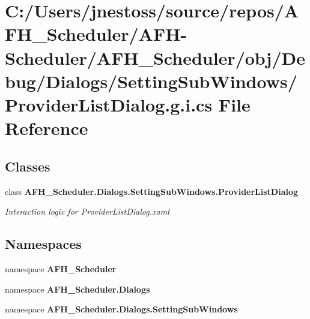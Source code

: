 \section{C\+:/\+Users/jnestoss/source/repos/\+A\+F\+H\+\_\+\+Scheduler/\+A\+F\+H-\/\+Scheduler/\+A\+F\+H\+\_\+\+Scheduler/obj/\+Debug/\+Dialogs/\+Setting\+Sub\+Windows/\+Provider\+List\+Dialog.g.\+i.\+cs File Reference}
\label{_debug_2_dialogs_2_setting_sub_windows_2_provider_list_dialog_8g_8i_8cs}
\subsection*{Classes}
\begin{DoxyCompactItemize}
\item 
class \textbf{ A\+F\+H\+\_\+\+Scheduler.\+Dialogs.\+Setting\+Sub\+Windows.\+Provider\+List\+Dialog}
\begin{DoxyCompactList}\small\item\em Interaction logic for Provider\+List\+Dialog.\+xaml \end{DoxyCompactList}\end{DoxyCompactItemize}
\subsection*{Namespaces}
\begin{DoxyCompactItemize}
\item 
namespace \textbf{ A\+F\+H\+\_\+\+Scheduler}
\item 
namespace \textbf{ A\+F\+H\+\_\+\+Scheduler.\+Dialogs}
\item 
namespace \textbf{ A\+F\+H\+\_\+\+Scheduler.\+Dialogs.\+Setting\+Sub\+Windows}
\end{DoxyCompactItemize}
